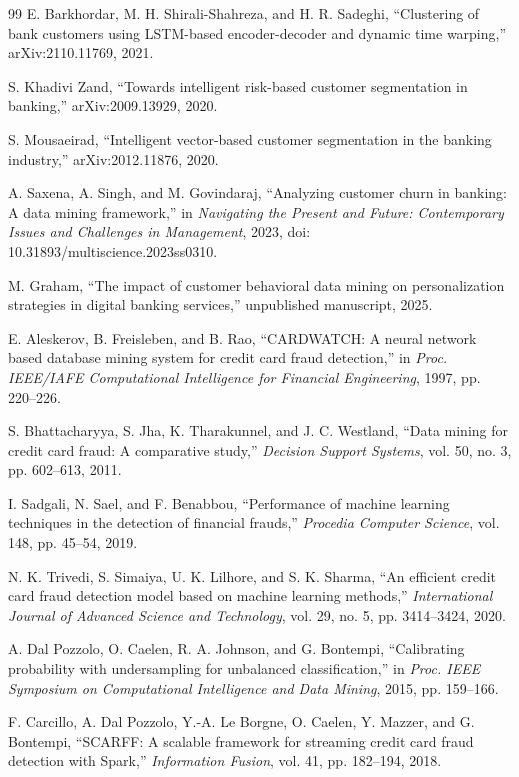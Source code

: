 \documentclass[conference]{IEEEtran}
\begin{document}
\begin{thebibliography}{99}
E. Barkhordar, M. H. Shirali-Shahreza, and H. R. Sadeghi, ``Clustering of bank customers using LSTM-based encoder-decoder and dynamic time warping,'' arXiv:2110.11769, 2021.

S. Khadivi Zand, ``Towards intelligent risk-based customer segmentation in banking,'' arXiv:2009.13929, 2020.

S. Mousaeirad, ``Intelligent vector-based customer segmentation in the banking industry,'' arXiv:2012.11876, 2020.

A. Saxena, A. Singh, and M. Govindaraj, ``Analyzing customer churn in banking: A data mining framework,'' in \textit{Navigating the Present and Future: Contemporary Issues and Challenges in Management}, 2023, doi: 10.31893/multiscience.2023ss0310.

M. Graham, ``The impact of customer behavioral data mining on personalization strategies in digital banking services,'' unpublished manuscript, 2025.

E. Aleskerov, B. Freisleben, and B. Rao, ``CARDWATCH: A neural network based database mining system for credit card fraud detection,'' in \textit{Proc. IEEE/IAFE Computational Intelligence for Financial Engineering}, 1997, pp. 220--226.

S. Bhattacharyya, S. Jha, K. Tharakunnel, and J. C. Westland, ``Data mining for credit card fraud: A comparative study,'' \textit{Decision Support Systems}, vol. 50, no. 3, pp. 602--613, 2011.

I. Sadgali, N. Sael, and F. Benabbou, ``Performance of machine learning techniques in the detection of financial frauds,'' \textit{Procedia Computer Science}, vol. 148, pp. 45--54, 2019.

N. K. Trivedi, S. Simaiya, U. K. Lilhore, and S. K. Sharma, ``An efficient credit card fraud detection model based on machine learning methods,'' \textit{International Journal of Advanced Science and Technology}, vol. 29, no. 5, pp. 3414--3424, 2020.

A. Dal Pozzolo, O. Caelen, R. A. Johnson, and G. Bontempi, ``Calibrating probability with undersampling for unbalanced classification,'' in \textit{Proc. IEEE Symposium on Computational Intelligence and Data Mining}, 2015, pp. 159--166.

F. Carcillo, A. Dal Pozzolo, Y.-A. Le Borgne, O. Caelen, Y. Mazzer, and G. Bontempi, ``SCARFF: A scalable framework for streaming credit card fraud detection with Spark,'' \textit{Information Fusion}, vol. 41, pp. 182--194, 2018.


\end{thebibliography}
\end{document}
